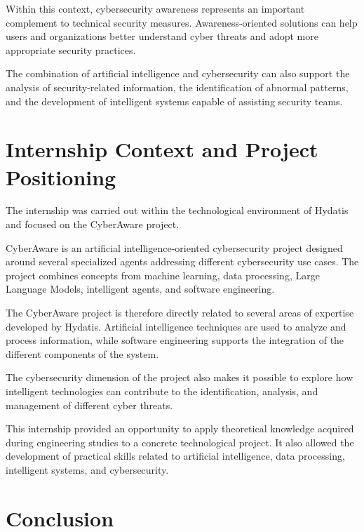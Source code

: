 \documentclass[12pt,a4paper]{report}
\begin{document}
Within this context, cybersecurity awareness represents an important complement to technical security measures. Awareness-oriented solutions can help users and organizations better understand cyber threats and adopt more appropriate security practices.

The combination of artificial intelligence and cybersecurity can also support the analysis of security-related information, the identification of abnormal patterns, and the development of intelligent systems capable of assisting security teams.

\section{Internship Context and Project Positioning}

The internship was carried out within the technological environment of Hydatis and focused on the CyberAware project.

CyberAware is an artificial intelligence-oriented cybersecurity project designed around several specialized agents addressing different cybersecurity use cases. The project combines concepts from machine learning, data processing, Large Language Models, intelligent agents, and software engineering.

The CyberAware project is therefore directly related to several areas of expertise developed by Hydatis. Artificial intelligence techniques are used to analyze and process information, while software engineering supports the integration of the different components of the system.

The cybersecurity dimension of the project also makes it possible to explore how intelligent technologies can contribute to the identification, analysis, and management of different cyber threats.

This internship provided an opportunity to apply theoretical knowledge acquired during engineering studies to a concrete technological project. It also allowed the development of practical skills related to artificial intelligence, data processing, intelligent systems, and cybersecurity.

\section*{Conclusion}
\end{document}
